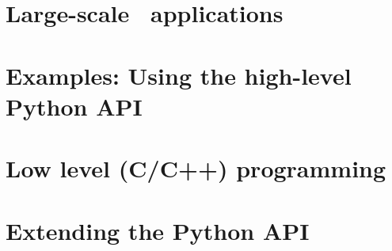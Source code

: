 \documentclass[11pt,fleqn]{book}
\begin{document}
 

 \thispagestyle{empty}
 \newpage
 \cleardoublepage 

 \pagestyle{plain}
 

 \cleardoublepage 
 
 \tableofcontents

 \newpage

 \cleardoublepage 

 \pagestyle{plain}
 
 
 



 \part{Large-scale \Peano\ applications}
 \newpage
 
 \newpage
 
 \newpage
 
 \newpage
 


 \part{Examples: Using the high-level Python API}
 \newpage
 
 \newpage
 

 
 
 \part{Low level (C/C++) programming}
 
 \newpage
 
 \newpage
 
 \newpage
 




%   
% 
% 
 \part{Extending the Python API}
 \newpage
 
 
\end{document}
